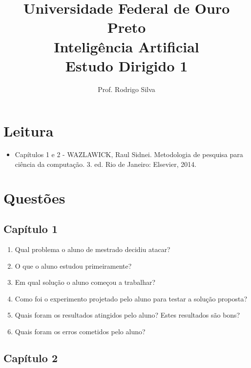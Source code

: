 \documentclass{article}
\title{\vspace{-2 cm}Universidade Federal de Ouro Preto \\ Inteligência Artificial \\ Estudo Dirigido 1}
\author{Prof. Rodrigo Silva}
\date{}
\begin{document}
\maketitle

\section{Leitura}

\begin{itemize}
    \item Capítulos 1 e 2 - WAZLAWICK, Raul Sidnei. Metodologia de pesquisa para ciência da computação. 3. ed. Rio de Janeiro: Elsevier, 2014.
\end{itemize}

\section{Questões}

\subsection{Capítulo 1}

\begin{enumerate}

\item Qual problema o aluno de mestrado decidiu atacar?

\item O que o aluno estudou primeiramente?

\item Em qual solução o aluno começou a trabalhar?  

\item Como foi o experimento projetado pelo aluno para testar a solução proposta?

\item Quais foram os resultados atingidos pelo aluno? Estes resultados são bons? 

\item Quais foram os erros cometidos pelo aluno?

\end{enumerate}

\subsection{Capítulo 2}
\end{document}
